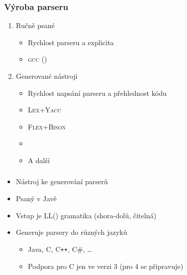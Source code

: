 \begin{frame}
  \frametitle{Výroba parseru}

  \begin{enumerate}

    \item Ručně psané
    \begin{itemize}
      \item Rychlost parseru a explicita
      \item \textsc{gcc} ()
    \end{itemize}

    \pause
    \medskip

    \item Generované nástroji
    \begin{itemize}
      \item Rychlost napsání parseru a přehlednost kódu
      \item \textsc{Lex}+\textsc{Yacc}
      \item \textsc{Flex}+\textsc{Bison}
      \item \emph{\ant}
      \item A další
    \end{itemize}

  \end{enumerate}

\end{frame}

\begin{frame}
  \frametitle{\ant}

  \begin{itemize}
  \item Nástroj ke generování parserů
  \item Psaný v Javě
  \item Vstup je LL(\textasteriskcentered) gramatika (shora-dolů, čitelná)

  \item Generuje parsery do různých jazyků
  \begin{itemize}
    \item Java, C, C\texttt{++}, C\#, \dots
    \item Podpora pro C jen ve verzi 3 (pro 4 se připravuje)
  \end{itemize}

  \end{itemize}

\end{frame}

